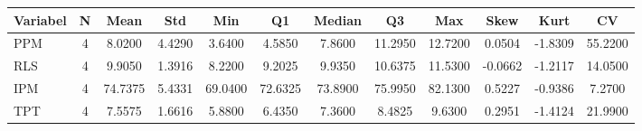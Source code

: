 \begin{adjustbox}{max width=\textwidth}
\small
\begin{tabular}{|p{2.5cm}|c|c|c|c|c|c|c|c|c|c|c|}
\hline
\textbf{Variabel} & \textbf{N} & \textbf{Mean} & \textbf{Std} & \textbf{Min} & \textbf{Q1} & \textbf{Median} & \textbf{Q3} & \textbf{Max} & \textbf{Skew} & \textbf{Kurt} & \textbf{CV} \\
\hline
PPM & 4 & 8.0200 & 4.4290 & 3.6400 & 4.5850 & 7.8600 & 11.2950 & 12.7200 & 0.0504 & -1.8309 & 55.2200 \\
RLS & 4 & 9.9050 & 1.3916 & 8.2200 & 9.2025 & 9.9350 & 10.6375 & 11.5300 & -0.0662 & -1.2117 & 14.0500 \\
IPM & 4 & 74.7375 & 5.4331 & 69.0400 & 72.6325 & 73.8900 & 75.9950 & 82.1300 & 0.5227 & -0.9386 & 7.2700 \\
TPT & 4 & 7.5575 & 1.6616 & 5.8800 & 6.4350 & 7.3600 & 8.4825 & 9.6300 & 0.2951 & -1.4124 & 21.9900 \\
\hline
\end{tabular}
\end{adjustbox}
